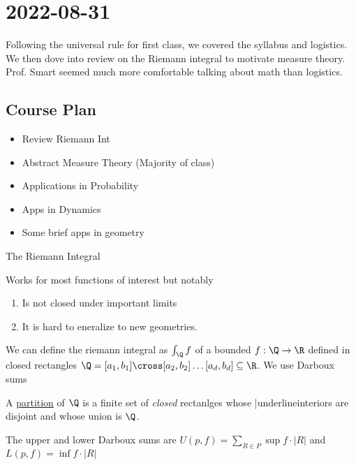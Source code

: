 \section{2022-08-31}

Following the universal rule for first class, we covered the syllabus and logistics. We then dove into review on the Riemann integral to motivate measure theory. Prof. Smart seemed much more comfortable talking about math than logistics.

\subsection{Course Plan}
\begin{itemize}
	\item Review Riemann Int
	\item Abstract Measure Theory (Majority of class)
	\item Applications in Probability
	\item Apps in Dynamics
	\item Some brief apps in geometry
\end{itemize}

\begin{problem} The Riemann Integral 
\item Works for most functions of interest but notably
	\begin{enumerate}
		\item Is not closed under important limits
		\item It is hard to eneralize to new geometries.
	\end{enumerate}
\end{problem}

\begin{definition}
	We can define the riemann integral as $\int_{{\Q}}^{{}} {f}$ of a bounded $f : \Q \to \R$ 
	defined in closed rectangles
	$\Q = [a_1,b_1] \cross [a_2,b_2] \ldots [a_d,b_d] \subseteq \R$. We use Darboux sums
\end{definition}

\vline
\begin{definition}[partition]
	A \underline{partition} of $\Q$	is a finite set of \emph{closed} rectanlges whose |underline{interiors} are disjoint and whose union is $\Q$.
\end{definition}

\vline

The upper and lower Darboux sums are $U(p,f) =\sum_{R \in P}^{} \sup f \cdot |R|$ and \newline 
$L(p,f) = \inf f \cdot |R|$

